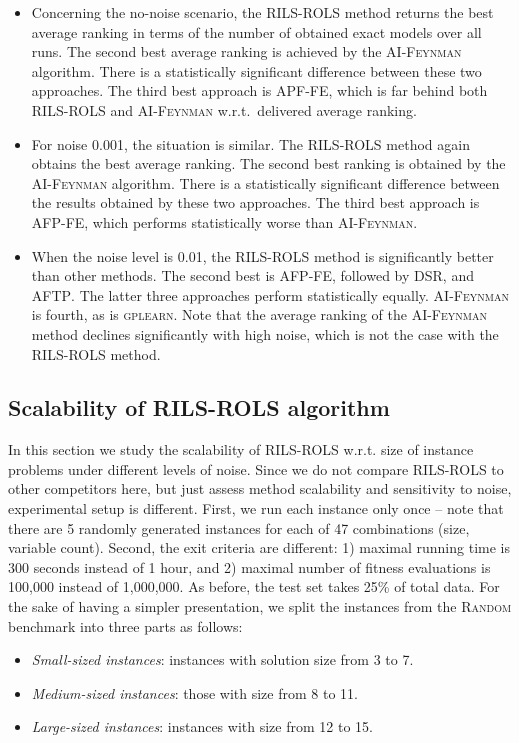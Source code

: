 \documentclass{bmcart}
\begin{document}
\begin{itemize}
	\item  Concerning the no-noise scenario, the \textsc{RILS}-\textsc{ROLS} method returns the best average ranking in terms of the number of obtained exact models over all runs.  The second best average ranking is achieved by the \textsc{AI-Feynman} algorithm. There is a statistically significant difference between these two approaches. The third best approach is \textsc{APF-FE},  which is far behind both \textsc{RILS}-\textsc{ROLS} and \textsc{AI-Feynman} w.r.t.\ delivered average ranking.  
	\item  For noise 0.001, the situation is similar. The \textsc{RILS}-\textsc{ROLS} method again obtains the best average ranking. The second best ranking is obtained by the \textsc{AI-Feynman} algorithm. There is a statistically significant difference between the results obtained by these two approaches. The third best approach is \textsc{AFP-FE}, which performs statistically worse than \textsc{AI-Feynman}.  
	\item  When the noise level is 0.01, the \textsc{RILS-ROLS} method is significantly better than other methods. The second best is \textsc{AFP-FE}, followed by \textsc{DSR}, and \textsc{AFTP}. The latter three approaches perform statistically equally. \textsc{AI-Feynman} is fourth, as is \textsc{gplearn}. Note that the average ranking of the \textsc{AI-Feynman} method declines significantly with high noise, which is not the case with the \textsc{RILS}-\textsc{ROLS} method.   
	
\end{itemize}

\subsection{Scalability of \textsc{RILS}-\textsc{ROLS} algorithm}\label{sec:scalability-rils-rols}

In this section we study the scalability of \textsc{RILS-ROLS} w.r.t. size of instance problems under different levels of noise.
Since we do not compare \textsc{RILS-ROLS} to other competitors here, but just assess method scalability and sensitivity to noise, experimental setup is different. First, we run each instance only once -- note that there are 5 randomly generated instances for each of 47 combinations (size, variable count). Second, the exit criteria are different: 1) maximal running time is 300 seconds instead of 1 hour, and 2) maximal number of fitness evaluations is 100,000 instead of 1,000,000. 
As before, the test set takes 25\% of total data. 
For the sake of having a simpler presentation, we split the instances from the \textsc{Random} benchmark into three parts as follows: 
\begin{itemize}
	\item \textit{Small-sized instances}: instances with solution size from 3 to 7.
	\item \textit{Medium-sized instances}: those with size from 8 to 11.
	\item \textit{Large-sized instances}: instances with size from 12 to 15. 
\end{itemize}
\end{document}
